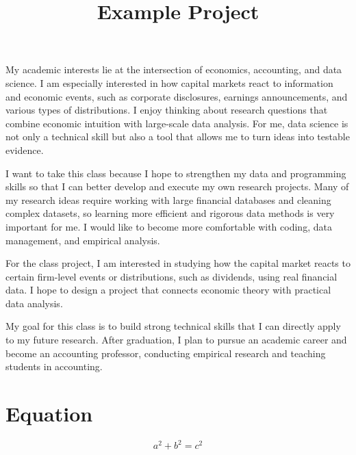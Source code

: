\documentclass[12pt]{article}
\begin{document}
\title{Example Project}
\author{}
\date{}
\maketitle

My academic interests lie at the intersection of economics, accounting, and data science. I am especially interested in how capital markets react to information and economic events, such as corporate disclosures, earnings announcements, and various types of distributions. I enjoy thinking about research questions that combine economic intuition with large-scale data analysis. For me, data science is not only a technical skill but also a tool that allows me to turn ideas into testable evidence.

I want to take this class because I hope to strengthen my data and programming skills so that I can better develop and execute my own research projects. Many of my research ideas require working with large financial databases and cleaning complex datasets, so learning more efficient and rigorous data methods is very important for me. I would like to become more comfortable with coding, data management, and empirical analysis.

For the class project, I am interested in studying how the capital market reacts to certain firm-level events or distributions, such as dividends, using real financial data. I hope to design a project that connects economic theory with practical data analysis.

My goal for this class is to build strong technical skills that I can directly apply to my future research. After graduation, I plan to pursue an academic career and become an accounting professor, conducting empirical research and teaching students in accounting.


\section*{Equation}

\begin{equation}
a^2 + b^2 = c^2
\end{equation}
\end{document}
